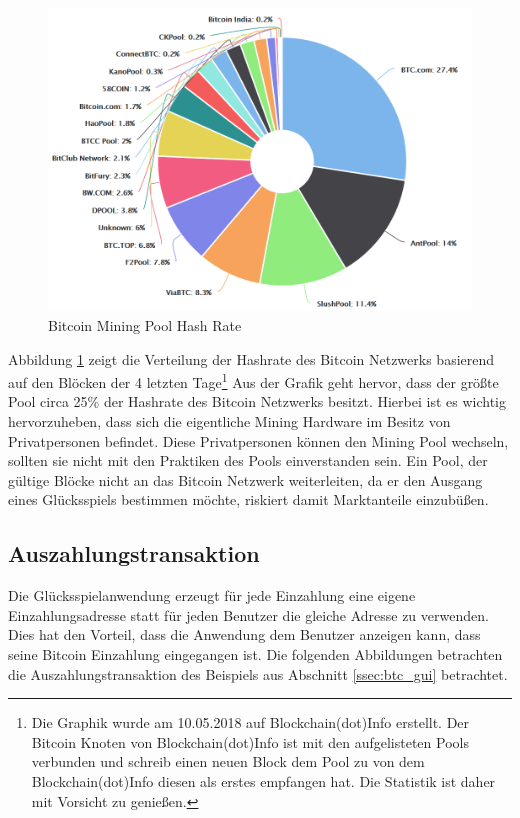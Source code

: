 \begin{figure}[H]
\centering
\includegraphics[width=1\linewidth]{Figures/btc_mining_pools}
\decoRule
\caption{Bitcoin Mining Pool Hash Rate \cite{blockchain_info_pools}}
\label{fig:btc_mining_pools}
\end{figure}

Abbildung \ref{fig:btc_mining_pools} zeigt die Verteilung der Hashrate des Bitcoin Netzwerks basierend auf den Blöcken der 4 letzten Tage\footnote{Die Graphik wurde am 10.05.2018 auf Blockchain(dot)Info erstellt. Der Bitcoin Knoten von Blockchain(dot)Info ist mit den aufgelisteten Pools verbunden und schreib einen neuen Block dem Pool zu von dem Blockchain(dot)Info diesen als erstes empfangen hat. Die Statistik ist daher mit Vorsicht zu genießen.} Aus der Grafik geht hervor, dass der größte Pool circa 25\% der Hashrate des Bitcoin Netzwerks besitzt. Hierbei ist es wichtig hervorzuheben, dass sich die eigentliche Mining Hardware im Besitz von Privatpersonen befindet. Diese Privatpersonen können den Mining Pool wechseln, sollten sie nicht mit den Praktiken des Pools einverstanden sein. Ein Pool, der gültige Blöcke nicht an das Bitcoin Netzwerk weiterleiten, da er den Ausgang eines Glücksspiels bestimmen möchte, riskiert damit Marktanteile einzubüßen.

\subsection{Auszahlungstransaktion} \label{sssec:Auszahlungstransaktion}
Die Glücksspielanwendung erzeugt für jede Einzahlung eine eigene Einzahlungsadresse statt für jeden Benutzer die gleiche Adresse zu verwenden. Dies hat den Vorteil, dass die Anwendung dem Benutzer anzeigen kann, dass seine Bitcoin Einzahlung eingegangen ist. Die folgenden Abbildungen betrachten die Auszahlungstransaktion des Beispiels aus Abschnitt \ref{ssec:btc_gui} betrachtet.

